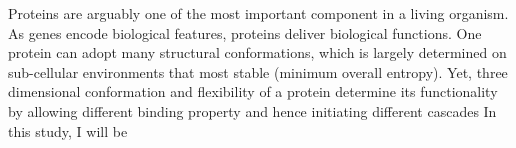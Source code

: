 Proteins are arguably one of the most important component in a living organism. As genes encode biological features, proteins deliver biological functions. One protein can adopt many structural conformations, which is largely determined on sub-cellular environments that most stable (minimum overall entropy). Yet, three dimensional conformation and flexibility of a protein determine its functionality by allowing different binding property and hence initiating different cascades     In this study, I will be 